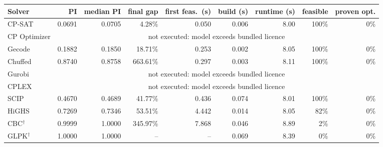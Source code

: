 \begin{tabular}{lrrrrrrrr}
\toprule
Solver & PI & median PI & final gap & first feas.\ (s) & build (s) & runtime (s) & feasible & proven opt. \\
\midrule
CP-SAT & 0.0691 & 0.0705 & 4.28\% & 0.050 & 0.006 & 8.00 & 100\% & 0\% \\
CP Optimizer & \multicolumn{8}{c}{not executed: model exceeds bundled licence} \\
Gecode & 0.1882 & 0.1850 & 18.71\% & 0.253 & 0.002 & 8.05 & 100\% & 0\% \\
Chuffed & 0.8740 & 0.8758 & 663.61\% & 0.297 & 0.003 & 8.11 & 100\% & 0\% \\
Gurobi & \multicolumn{8}{c}{not executed: model exceeds bundled licence} \\
CPLEX & \multicolumn{8}{c}{not executed: model exceeds bundled licence} \\
SCIP & 0.4670 & 0.4689 & 41.77\% & 0.436 & 0.074 & 8.01 & 100\% & 0\% \\
HiGHS & 0.7269 & 0.7346 & 53.51\% & 4.442 & 0.014 & 8.05 & 82\% & 0\% \\
CBC$^\dagger$ & 0.9999 & 1.0000 & 345.97\% & 7.868 & 0.046 & 8.89 & 2\% & 0\% \\
GLPK$^\dagger$ & 1.0000 & 1.0000 & -- & -- & 0.069 & 8.39 & 0\% & 0\% \\
\bottomrule
\end{tabular}
